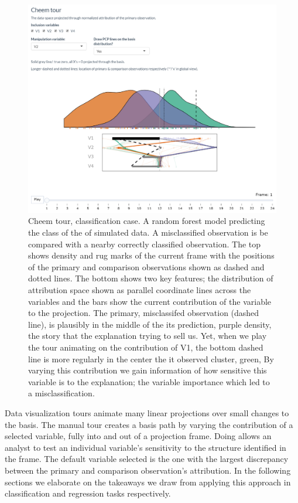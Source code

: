 \documentclass[
]{article}
\begin{document}
\begin{figure}

{\centering \includegraphics[width=1\linewidth]{./figures/cheem_tour_toy_class} 

}

\caption{Cheem tour, classification case. A random forest model predicting the class of the of simulated data. A misclassified observation is be compared with a nearby correctly classified observation. The top shows density and rug marks of the current frame with the positions of the primary and comparison observations shown as dashed and dotted lines. The bottom shows two key features; the distribution of attribution space shown as parallel coordinate lines across the variables and the bars show the current contribution of the variable to the projection. The primary, misclassifed observation (dashed line), is plausibly in the middle of the its prediction, purple density, the story that the explanation trying to sell us. Yet, when we play the tour animating on the contribution of V1, the bottom dashed line is more regularly in the center the it observed cluster, green, By varying this contribution we gain information of how sensitive this variable is to the explanation; the variable importance which led to a misclassification.}\label{fig:cheemtourclass}
\end{figure}

Data visualization tours animate many linear projections over small changes to the basis. The manual tour creates a basis path by varying the contribution of a selected variable, fully into and out of a projection frame. Doing allows an analyst to test an individual variable's sensitivity to the structure identified in the frame. The default variable selected is the one with the largest discrepancy between the primary and comparison observation's attribution. In the following sections we elaborate on the takeaways we draw from applying this approach in classification and regression tasks respectively.
\end{document}

